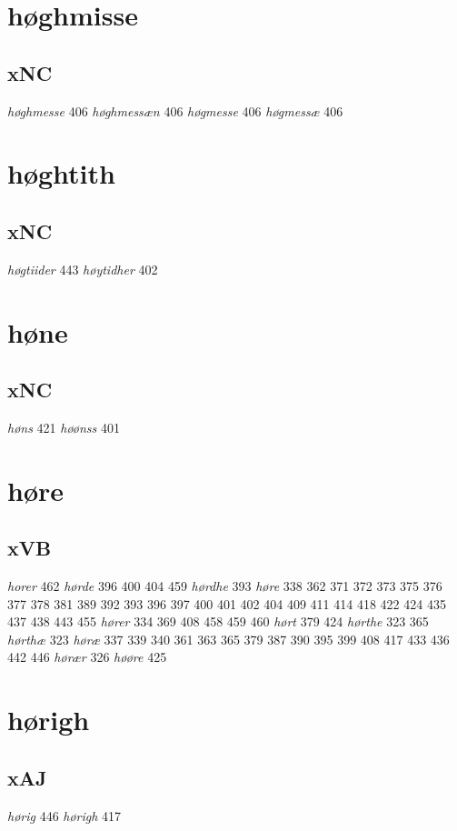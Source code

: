 \documentclass[a4paper,twocolumn]{article}
\begin{document}
\section{høghmisse}
\label{sec:orgfd8bf45}
\subsection{xNC}
\label{sec:org72a1f92}
\emph{høghmesse} 406 \emph{høghmessæn} 406 \emph{høgmesse} 406 \emph{høgmessæ} 406 
\section{høghtith}
\label{sec:org221a869}
\subsection{xNC}
\label{sec:org785cd53}
\emph{høgtiider} 443 \emph{høytidher} 402 
\section{høne}
\label{sec:org7331057}
\subsection{xNC}
\label{sec:org77077ef}
\emph{høns} 421 \emph{høønss} 401 
\section{høre}
\label{sec:orgd373b3f}
\subsection{xVB}
\label{sec:orgef15b4a}
\emph{horer} 462 \emph{hørde} 396 400 404 459 \emph{hørdhe} 393 \emph{høre} 338 362 371 372 373 375 376 377 378 381 389 392 393 396 397 400 401 402 404 409 411 414 418 422 424 435 437 438 443 455 \emph{hører} 334 369 408 458 459 460 \emph{hørt} 379 424 \emph{hørthe} 323 365 \emph{hørthæ} 323 \emph{høræ} 337 339 340 361 363 365 379 387 390 395 399 408 417 433 436 442 446 \emph{hørær} 326 \emph{høøre} 425 
\section{hørigh}
\label{sec:orge5e6483}
\subsection{xAJ}
\label{sec:orgc82b5b8}
\emph{hørig} 446 \emph{hørigh} 417 
\end{document}
